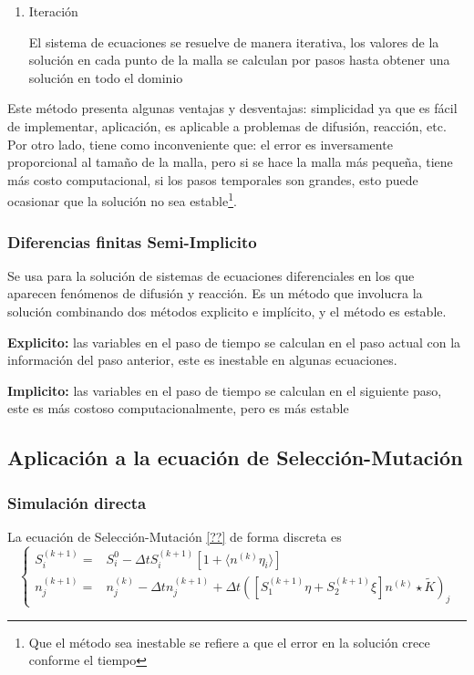 \documentclass[letterpaper]{article}
\begin{document}
{\begin{enumerate}
                \item Iteración

                     El sistema de ecuaciones se resuelve de manera iterativa, los valores de la solución en cada punto de la malla se calculan por pasos hasta obtener una solución en todo el dominio
                 \end{enumerate}
        
                    Este método presenta algunas ventajas y desventajas: simplicidad ya que es fácil de implementar, aplicación, es aplicable a problemas de difusión, reacción, etc. Por otro lado, tiene como inconveniente que: el error es inversamente proporcional al tamaño de la malla, pero si se hace la malla más pequeña, tiene más costo computacional, si los pasos temporales son grandes, esto puede ocasionar que la solución no sea estable\footnote{Que el método sea inestable se refiere a que el error en la solución crece conforme el tiempo}.

            \subsubsection{Diferencias finitas Semi-Implicito}

                 Se usa para la solución de sistemas de ecuaciones diferenciales en los que aparecen fenómenos de difusión y reacción. Es un método que involucra la solución combinando dos métodos explicito e implícito, y el método es estable.

                \textbf{Explicito:} las variables en el paso de tiempo se calculan en el paso actual con la información del paso anterior, este es inestable en algunas ecuaciones.

                \textbf{Implicito:} las variables en el paso de tiempo se calculan en el siguiente paso, este es más costoso computacionalmente, pero es más estable

    \subsection{Aplicación a la ecuación de Selección-Mutación}
    \subsubsection{Simulación directa}

    La ecuación de Selección-Mutación \eqref{??} de forma discreta es
    \begin{equation}
        \left\{\begin{matrix}
            S_{i}^{(k+1)} = &  S_{i}^{0}-\Delta tS_{i}^{(k+1)}[1+\langle{n^{(k)}\eta_{i}}\rangle  ] \\
            n_{j}^{(k+1)} = &  n_{j}^{(k)}-\Delta t n_{j}^{(k+1)}+\Delta t([S_{1}^{(k+1)}\eta+S_{2}^{(k+1)}\xi]n^{(k)}\star \tilde{K})_{j}
        \end{matrix}\right.
    \label{eq:S-M_dis}
    \end{equation}

}
\end{document}
